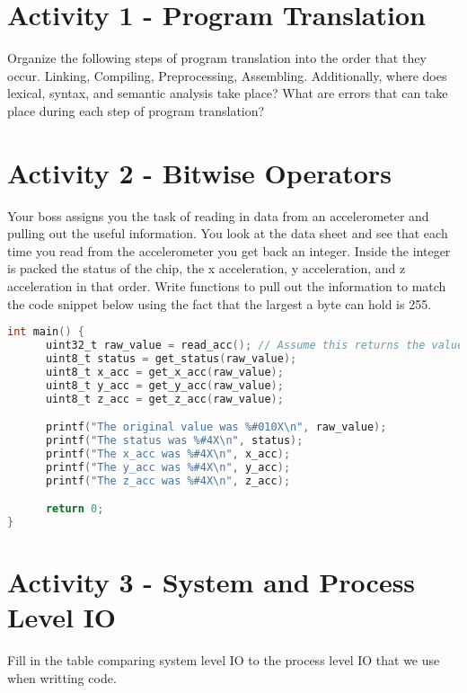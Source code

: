 \documentclass[]{article}
\begin{document}
\section*{Activity 1 - Program Translation}
Organize the following steps of program translation into the order that they occur. Linking,
Compiling, Preprocessing, Assembling. Additionally, where does lexical, syntax, and semantic
analysis take place? What are errors that can take place during each step of program translation?

\section*{Activity 2 - Bitwise Operators}
Your boss assigns you the task of reading in data from an accelerometer and pulling out the useful
information. You look at the data sheet and see that each time you read from the accelerometer you
get back an integer. Inside the integer is packed the status of the chip, the x acceleration, y
acceleration, and z acceleration in that order. Write functions to pull out the information to 
match the code snippet below using the fact that the largest a byte can hold is 255.
\begin{lstlisting}[language=C]
int main() {
      uint32_t raw_value = read_acc(); // Assume this returns the value from the accelerometer
      uint8_t status = get_status(raw_value);
      uint8_t x_acc = get_x_acc(raw_value);
      uint8_t y_acc = get_y_acc(raw_value);
      uint8_t z_acc = get_z_acc(raw_value);

      printf("The original value was %#010X\n", raw_value);
      printf("The status was %#4X\n", status);
      printf("The x_acc was %#4X\n", x_acc);
      printf("The y_acc was %#4X\n", y_acc);
      printf("The z_acc was %#4X\n", z_acc);

      return 0;
}
\end{lstlisting}

\section*{Activity 3 - System and Process Level IO}
Fill in the table comparing system level IO to the process level IO that we use when writting code.
\end{document}
